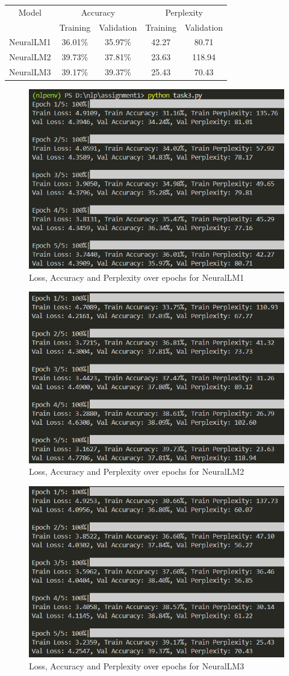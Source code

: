 \documentclass{article}
\begin{document}
\begin{table}[h]
    \centering
    \begin{tabular}{|c|c|c|c|c|}
        \hline
        \multirow{}{}{Model} & \multicolumn{2}{c|}{Accuracy} & \multicolumn{2}{c|}{Perplexity} \\
        \cline{2-5}
        & Training & Validation & Training & Validation \\
        \hline
        NeuralLM1 & 36.01\% & 35.97\% & 42.27 & 80.71 \\
        NeuralLM2 & 39.73\% & 37.81\% & 23.63 & 118.94 \\
        NeuralLM3 & 39.17\% & 39.37\% & 25.43 & 70.43 \\
        \hline
    \end{tabular}
\end{table}

\begin{figure}[H]
    \centering
    \includegraphics[width=0.5\linewidth]{model1.png}
    \caption{Loss, Accuracy and Perplexity over epochs for NeuralLM1}
\end{figure}

\begin{figure}[H]
    \centering
    \includegraphics[width=0.5\linewidth]{model2.png}
    \caption{Loss, Accuracy and Perplexity over epochs for NeuralLM2}
\end{figure}

\begin{figure}[H]
    \centering
    \includegraphics[width=0.5\linewidth]{model3.png}
    \caption{Loss, Accuracy and Perplexity over epochs for NeuralLM3}
\end{figure}
\end{document}
